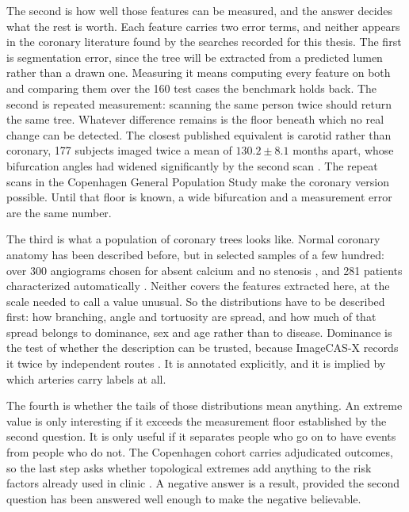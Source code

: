 The second is how well those features can be measured, and the answer decides what the rest is
worth.
Each feature carries two error terms, and neither appears in the coronary literature found by the
searches recorded for this thesis.
The first is segmentation error, since the tree will be extracted from a predicted lumen rather than
a drawn one.
Measuring it means computing every feature on both and comparing them over the 160 test cases the
benchmark holds back.
The second is repeated measurement: scanning the same person twice should return the same tree.
Whatever difference remains is the floor beneath which no real change can be detected.
The closest published equivalent is carotid rather than coronary, 177 subjects imaged twice a mean of
$130.2 \pm 8.1$ months apart, whose bifurcation angles had widened significantly by the second scan
\cite{kwon2022carotid}.
The repeat scans in the Copenhagen General Population Study make the coronary version possible.
Until that floor is known, a wide bifurcation and a measurement error are the same number.

The third is what a population of coronary trees looks like.
Normal coronary anatomy has been described before, but in selected samples of a few hundred: over 300
angiograms chosen for absent calcium and no stenosis \cite{medranogracia2016atlas}, and 281 patients
characterized automatically \cite{nannini2024characterization}.
Neither covers the features extracted here, at the scale needed to call a value unusual.
So the distributions have to be described first: how branching, angle and tortuosity are spread, and
how much of that spread belongs to dominance, sex and age rather than to disease.
Dominance is the test of whether the description can be trusted, because ImageCAS-X records it twice
by independent routes \cite{bransby2026imagecasx}.
It is annotated explicitly, and it is implied by which arteries carry labels at all.

The fourth is whether the tails of those distributions mean anything.
An extreme value is only interesting if it exceeds the measurement floor established by the second
question.
It is only useful if it separates people who go on to have events from people who do not.
The Copenhagen cohort carries adjudicated outcomes, so the last step asks whether topological
extremes add anything to the risk factors already used in clinic \cite{fuchs2023cgps}.
A negative answer is a result, provided the second question has been answered well enough to make
the negative believable.

